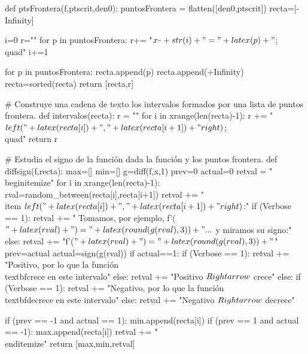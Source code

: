 \begin{sagesilent}
def ptsFrontera(f,ptscrit,den0):
    puntosFrontera = flatten([den0,ptscrit])
    recta=[-Infinity]

    i=0
    r=""
    for p in puntosFrontera:
        r+= "$x_"+str(i)+"="+latex(p)+"$;\\quad"
        i+=1

    for p in puntosFrontera:
        recta.append(p)
    recta.append(+Infinity)
    recta=sorted(recta)
    return [recta,r]

# Construye una cadena de texto los intervalos formados por una lista de puntos frontera.
def intervalos(recta):
    r = ""
    for i in xrange(len(recta)-1):
        r += "$\\left("+latex(recta[i])+","+latex(recta[i+1])+"\\right)$;\\quad"  
    return r

# Estudia el signo de la función dada la función y los puntos frontera.
def diffsign(f,recta):
    max=[]
    min=[]
    g=diff(f,x,1)
    prev=0
    actual=0
    retval = "\\begin{itemize}"
    for i in xrange(len(recta)-1):
        rval=random_between(recta[i],recta[i+1])
        retval += "\\item $\\left("+latex(recta[i])+","+latex(recta[i+1])+"\\right)$:"
        if (Verbose == 1):
            retval += " Tomamos, por ejemplo, f'($"+latex(rval)+") = "+latex(round(g(rval),3))+"...$  y miramos su signo:" 
        else:
            retval += "f'($"+latex(rval)+") = "+latex(round(g(rval),3)) +"$"
        prev=actual
        actual=sign(g(rval))
        if actual==1: 
            if (Verbose == 1):
                retval += "Positivo, por lo que la función \\textbf{crece} en este intervalo"  
            else:
                retval += "Positivo $\\Rightarrow$ crece"
        else:
            if (Verbose == 1):
                retval += "Negativo, por lo que la función \\textbf{decrece} en este intervalo"
            else:
                retval += "Negativo $\\Rightarrow$ decrece"

        if (prev == -1 and actual == 1):
            min.append(recta[i])
        if (prev == 1 and actual == -1):
            max.append(recta[i])
    retval += "\\end{itemize}"
    return [max,min,retval]


\end{sagesilent}
